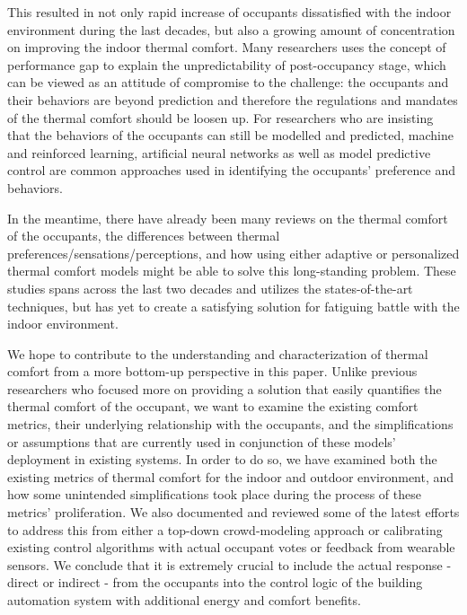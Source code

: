 This resulted in not only rapid increase of occupants dissatisfied with the indoor environment during the last decades, but also a growing amount of concentration on improving the indoor thermal comfort. Many researchers uses the concept of performance gap to explain the unpredictability of post-occupancy stage\cite{shi_magnitude_2019,allard_energy_2018}, which can be viewed as an attitude of compromise to the challenge: the occupants and their behaviors are beyond prediction and therefore the regulations and mandates of the thermal comfort should be loosen up. For researchers who are insisting that the behaviors of the occupants can still be modelled and predicted, machine and reinforced learning\cite{peng_using_2018}, artificial neural networks\cite{sugimoto_human_2013} as well as model predictive control \cite{jazizadeh_user-led_2014,brooks_experimental_2014} are common approaches used in identifying the occupants' preference and behaviors.

In the meantime, there have already been many reviews on the thermal comfort of the occupants, the differences between thermal preferences/sensations/perceptions\cite{charles_fangers_2003}, and how using either adaptive \cite{nicol_adaptive_2002,nicol_overview_2010} or personalized thermal comfort models\cite{kim_personal_2018} might be able to solve this long-standing problem. These studies spans across the last two decades and utilizes the states-of-the-art techniques, but has yet to create a satisfying solution for fatiguing battle with the indoor environment\cite{noauthor_occupational_nodate}.

We hope to contribute to the understanding and characterization of thermal comfort from a more bottom-up perspective in this paper. Unlike previous researchers who focused more on providing a solution that easily quantifies the thermal comfort of the occupant, we want to examine the existing comfort metrics, their underlying relationship with the occupants, and the simplifications or assumptions that are currently used in conjunction of these models' deployment in existing systems. In order to do so, we have examined both the existing metrics of thermal comfort for the indoor and outdoor environment, and how some unintended simplifications took place during the process of these metrics' proliferation. We also documented and reviewed some of the latest efforts to address this from either a top-down crowd-modeling approach\cite{salamone_integrated_2018} or calibrating existing control algorithms with actual occupant votes\cite{gao_using_2010} or feedback from wearable sensors\cite{abdallah_moatassem_sensing_2017}. We conclude that it is extremely crucial to include the actual response - direct or indirect  - from the occupants into the control logic of the building automation system with additional energy and comfort benefits.

